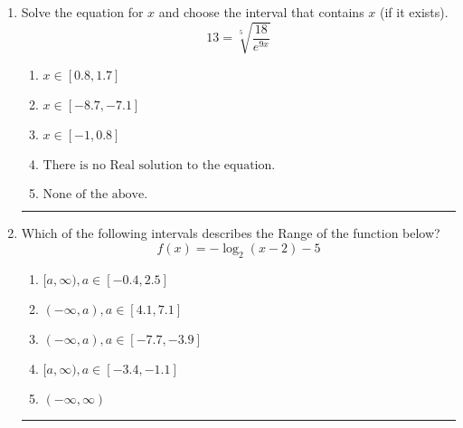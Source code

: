 \documentclass[14pt]{extbook}
\newcommand{\litem}[1]{\item#1\hspace*{-1cm}\rule{\textwidth}{0.4pt}}
\begin{document}
\begin{enumerate}
{\begin{enumerate}[label=\Alph*.]
\end{enumerate} }
\litem{
 Solve the equation for $x$ and choose the interval that contains $x$ (if it exists).\[  13 = \sqrt[5]{\frac{18}{e^{9x}}} \]\begin{enumerate}[label=\Alph*.]
\item \( x \in [0.8, 1.7] \)
\item \( x \in [-8.7, -7.1] \)
\item \( x \in [-1, 0.8] \)
\item \( \text{There is no Real solution to the equation.} \)
\item \( \text{None of the above.} \)

\end{enumerate} }
\litem{
Which of the following intervals describes the Range of the function below?\[ f(x) = -\log_2{(x-2)}-5 \]\begin{enumerate}[label=\Alph*.]
\item \( [a, \infty), a \in [-0.4, 2.5] \)
\item \( (-\infty, a), a \in [4.1, 7.1] \)
\item \( (-\infty, a), a \in [-7.7, -3.9] \)
\item \( [a, \infty), a \in [-3.4, -1.1] \)
\item \( (-\infty, \infty) \)

\end{enumerate} }
\end{enumerate}
\end{document}
